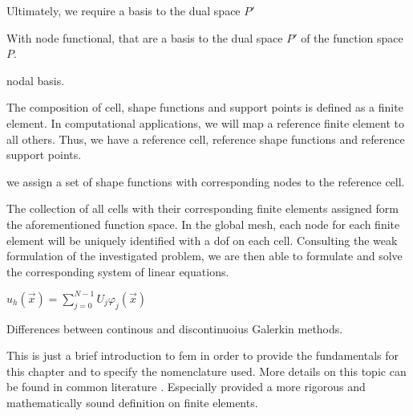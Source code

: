 
Ultimately, we require a basis to the dual space $P'$ 

With node functional, that are a basis to the dual space $P'$ of the function space $P$.

nodal basis.


The composition of cell, shape functions and support points is defined as a finite element. In computational applications, we will map a reference finite element to all others. Thus, we have a reference cell, reference shape functions and reference support points.

 we assign a set of shape functions with corresponding nodes to the reference cell.

The collection of all cells with their corresponding finite elements assigned form the aforementioned function space. In the global mesh, each node for each finite element will be uniquely identified with a \gls{dof} on each cell. Consulting the weak formulation of the investigated problem, we are then able to formulate and solve the corresponding system of linear equations.

$u_h(\vec{x}) = \sum_{j=0}^{N-1} U_j \varphi_j(\vec{x})$

Differences between continous and discontinuoius Galerkin methods.

This is just a brief introduction to \gls{fem} in order to provide the fundamentals for this chapter and to specify the nomenclature used. More details on this topic can be found in common literature \parencite[e.g.][]{girault1986, elman2014, kuzmin2015} . Especially \textcite{brenner2008} provided a more rigorous and mathematically sound definition on finite elements.



